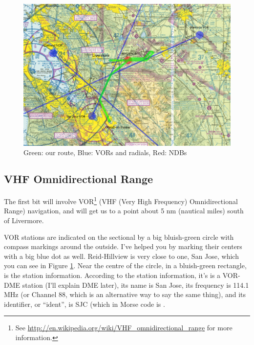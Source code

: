 \begin{figure}
  \begin{center}
    \includegraphics[width=20cm, angle=-90]{img/sectional_labelled}
    \caption{Green: our route, Blue: VORs and radials, Red: NDBs}
    \label{fig:sectional_labelled}
  \end{center}
\end{figure}


\subsection{VHF Omnidirectional Range}

The first bit will involve
VOR\footnote{See \url{http://en.wikipedia.org/wiki/VHF_omnidirectional_range}
for more information.} (VHF (Very High Frequency) Omnidirectional
Range) navigation, and will get us to a point about 5 nm (nautical
miles) south of Livermore.

VOR stations are indicated on the sectional by a big bluish-green
circle with compass markings around the outside.  I've helped you by
marking their centers with a big blue dot as well.  Reid-Hillview is
very close to one, San Jose, which you can see in Figure
\ref{fig:sectional_labelled}.  Near the centre of the circle, in a
bluish-green rectangle, is the station information.  According to the
station information, it's is a VOR-DME station (I'll explain DME
later), its name is San Jose, its frequency is 114.1 MHz (or Channel
88, which is an alternative way to say the same thing), and its
identifier, or ``ident'', is SJC (which in Morse code is
\mdot\mdot\mdot\mspace \mdot\mdash\mdash\mdash\mspace
\mdash\mdot\mdash\mdot.

